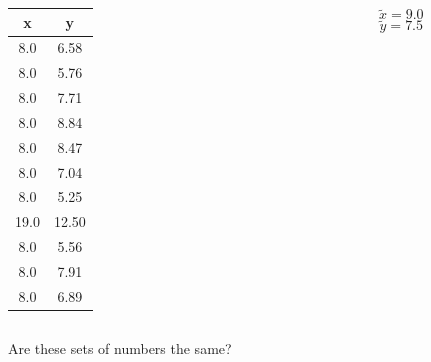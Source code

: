 \documentclass{beamer}
\begin{document}
\begin{frame}
    \Large
	\begin{columns}
		\begin{column}{.5\textwidth}
			\begin{center}
				\begin{tabular}{cc}
					\toprule
					x &      y \\
					\midrule
					 8.0 & 6.58 \\
					 8.0 & 5.76 \\
					 8.0 & 7.71 \\
					 8.0 & 8.84 \\
					 8.0 & 8.47 \\
					 8.0 & 7.04 \\
					 8.0 & 5.25 \\
					19.0 & 12.50 \\
					 8.0 & 5.56 \\
					 8.0 & 7.91 \\
					 8.0 & 6.89 \\
					\bottomrule
				\end{tabular}
			\end{center}
		\end{column}
		\begin{column}{.5\textwidth}
            \pause
            \[
            \tilde x = 9.0
            \]
            \pause
            \[
            \tilde y = 7.5
            \]
        \end{column}
	\end{columns}
\end{frame}

\begin{frame}
	\begin{center}
		\Large
		Are these sets of numbers the same?
	\end{center}
\end{frame}
\end{document}
